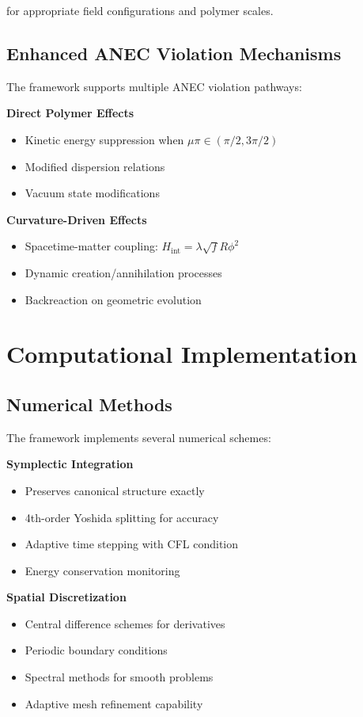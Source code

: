 \documentclass[11pt]{article}
\begin{document}
for appropriate field configurations and polymer scales.

\subsection{Enhanced ANEC Violation Mechanisms}

The framework supports multiple ANEC violation pathways:

\textbf{Direct Polymer Effects}
\begin{itemize}
\item Kinetic energy suppression when $\mu\pi \in (\pi/2, 3\pi/2)$
\item Modified dispersion relations
\item Vacuum state modifications
\end{itemize}

\textbf{Curvature-Driven Effects}
\begin{itemize}
\item Spacetime-matter coupling: $H_{\text{int}} = \lambda\sqrt{f}R\phi^2$
\item Dynamic creation/annihilation processes
\item Backreaction on geometric evolution
\end{itemize}

\section{Computational Implementation}

\subsection{Numerical Methods}

The framework implements several numerical schemes:

\textbf{Symplectic Integration}
\begin{itemize}
\item Preserves canonical structure exactly
\item 4th-order Yoshida splitting for accuracy
\item Adaptive time stepping with CFL condition
\item Energy conservation monitoring
\end{itemize}

\textbf{Spatial Discretization}
\begin{itemize}
\item Central difference schemes for derivatives
\item Periodic boundary conditions
\item Spectral methods for smooth problems
\item Adaptive mesh refinement capability
\end{itemize}
\end{document}
